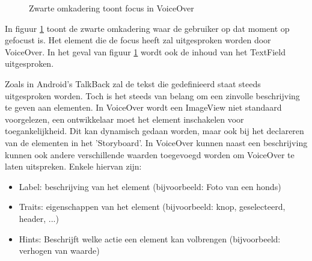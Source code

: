 \begin{figure}[h]
    \centering
    \caption{Zwarte omkadering toont focus in VoiceOver }
    \label{fig:VoiceOverfocus}
\end{figure}

In figuur \ref{fig:VoiceOverfocus} toont de zwarte omkadering waar de gebruiker op dat moment op gefocust is. Het element die de focus heeft zal uitgesproken worden door VoiceOver. In het geval van figuur \ref{fig:VoiceOverfocus} wordt ook de inhoud van het TextField uitgesproken.

Zoals in Android's TalkBack zal de tekst die gedefinieerd staat steeds uitgesproken worden. Toch is het steeds van belang om een zinvolle beschrijving te geven aan elementen. 
In VoiceOver wordt een ImageView niet standaard voorgelezen, een ontwikkelaar moet het element inschakelen voor toegankelijkheid. Dit kan dynamisch gedaan worden, maar ook bij het declareren van de elementen in het 'Storyboard'.
\newpage
In VoiceOver kunnen naast een beschrijving kunnen ook andere verschillende waarden toegevoegd worden om VoiceOver te laten uitspreken. Enkele hiervan zijn:
\begin{itemize}
    \item Label: beschrijving van het element (bijvoorbeeld: Foto van een honds)
    \item Traits: eigenschappen van het element (bijvoorbeeld: knop, geselecteerd, header, ...)
    \item Hints: Beschrijft welke actie een element kan volbrengen (bijvoorbeeld: verhogen van waarde)
\end{itemize}

    


